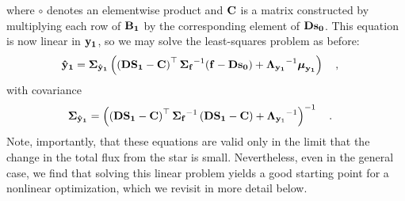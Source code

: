 \documentclass[modern]{aastex631}
\begin{document}
%
where $\circ$ denotes an elementwise product and ${\mathbf{C}}$ is a matrix constructed by multiplying each row of ${\mathbf{B_1}}$ by the corresponding element of ${\mathbf{D}}{\mathbf{s_0}}$.
%
This equation is now linear in ${\mathbf{y}}_{\mathbf{1}}$, so we may solve the least-squares problem as before:
%
\begin{align}
    \label{eq:norm:yhat}
    {\ensuremath{\mathbf{\hat{y}_1}}} & =
    \boldsymbol{\Sigma}_\mathbf{\hat{y}_1}
    \left(
    \left({\mathbf{D}}{\mathbf{S_1}} - {\mathbf{C}}\right)^\top
    {\boldsymbol{\Sigma}_\mathbf{f}}^{-1}
    ({\mathbf{f}} - {\mathbf{D}}{\mathbf{s_0}})
    +
    {\boldsymbol{\Lambda}_{\mathbf{y}_{\mathbf{1}}}}^{-1} \boldsymbol{\mu}_{\mathbf{y}_{\mathbf{1}}}
    \right)
    \quad,
\end{align}
%
with covariance
%
\begin{align}
    \label{eq:norm:ycov}
    \boldsymbol{\Sigma}_\mathbf{\hat{y}_1} & =
    \left(
    \left({\mathbf{D}}{\mathbf{S_1}} - {\mathbf{C}}\right)^\top
    {\boldsymbol{\Sigma}_\mathbf{f}}^{-1}
    \left({\mathbf{D}}{\mathbf{S_1}} - {\mathbf{C}}\right)
    +
    {\boldsymbol{\Lambda}_{\mathbf{y}_1}}^{-1}
    \right)^{-1}
    \quad.
\end{align}
%
Note, importantly, that these equations are valid only in the limit that the change in the total flux from the star is small. 
Nevertheless, even in the general case, we find that solving this linear problem yields a good starting point for a nonlinear optimization, which we revisit in more detail below.
\end{document}
